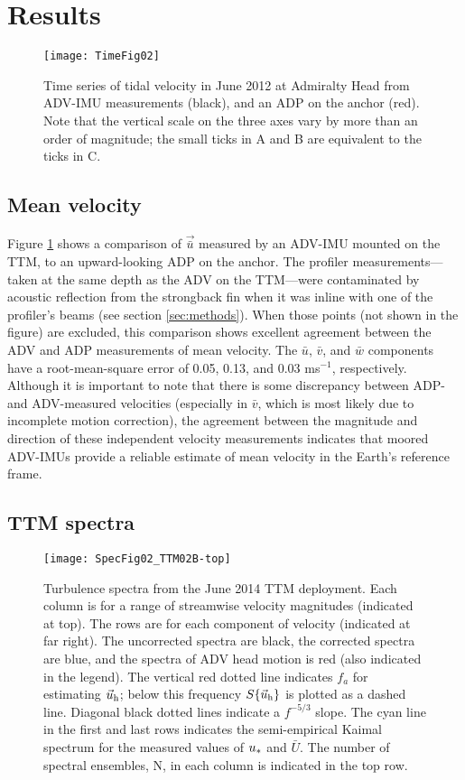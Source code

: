 \section{Results}
\label{sec:results}

\begin{figure}[t]
  \centering
  \texttt{[image: TimeFig02]}
  \caption{Time series of tidal velocity in June 2012 at Admiralty Head from ADV-IMU measurements (black), and an ADP on the anchor (red). Note that the vertical scale on the three axes vary by more than an order of magnitude; the small ticks in A and B are equivalent to the ticks in C.}
  \label{fig:vel_time}
\end{figure}

\subsection{Mean velocity}

Figure \ref{fig:vel_time} shows a comparison of $\vec{\bar u}$ measured by an ADV-IMU mounted on the TTM, to an upward-looking ADP on the anchor. The profiler measurements---taken at the same depth as the ADV on the TTM---were contaminated by acoustic reflection from the strongback fin when it was inline with one of the profiler's beams (see section \ref{sec:methods}). When those points (not shown in the figure) are excluded, this comparison shows excellent agreement between the ADV and ADP measurements of mean velocity. The $\bar u$, $\bar v$, and $\bar w$ components have a root-mean-square error of 0.05, 0.13, and 0.03 ms$^{-1}$, respectively. Although it is important to note that there is some discrepancy between ADP- and ADV-measured velocities (especially in $\bar v$, which is most likely due to incomplete motion correction), the agreement between the magnitude and direction of these independent velocity measurements indicates that moored ADV-IMUs provide a reliable estimate of mean velocity in the Earth's reference frame.

\subsection{TTM spectra}

\begin{figure*}[t]
  \centering
  \texttt{[image: SpecFig02\_TTM02B-top]}
  \caption{Turbulence spectra from the June 2014 TTM deployment. Each column is for a range of streamwise velocity magnitudes (indicated at top). The rows are for each component of velocity (indicated at far right). The uncorrected spectra are black, the corrected spectra are blue, and the spectra of ADV head motion is red (also indicated in the legend). The vertical red dotted line indicates $f_a$ for estimating $\vec{u}_{\mathrm{h}}$; below this frequency $S\{\vec{u}_{\mathrm{h}}\}$ is plotted as a dashed line.   Diagonal black dotted lines indicate a $f^{-5/3}$ slope. The cyan line in the first and last rows indicates the semi-empirical Kaimal spectrum for the measured values of $u_*$ and $\bar U$. The number of spectral ensembles, N, in each column is indicated in the top row.}
  \label{fig:spec:ttm}
\end{figure*}


